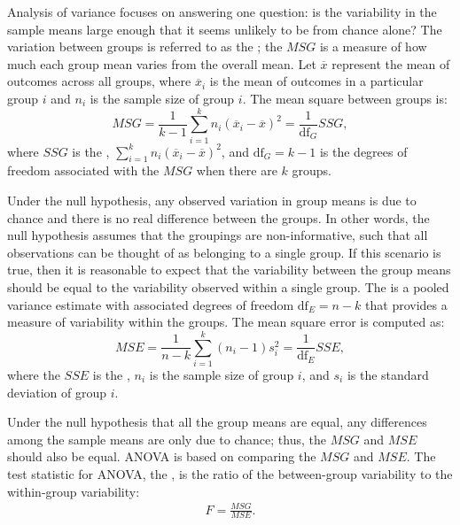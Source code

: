 Analysis of variance focuses on answering one question: is the variability in the sample means large enough that it seems unlikely to be from chance alone? The variation between groups is referred to as the ; the $MSG$ is a measure of how much each group mean varies from the overall mean. Let $\overline{x}$ represent the mean of outcomes across all groups, where $\overline{x}_i$ is the mean of outcomes in a particular group $i$ and $n_i$ is the sample size of group $i$. The mean square between groups is:
\[MSG = \frac{1}{k-1}\sum_{i=1}^{k} n_{i}\left(\overline{x}_{i} - \overline{x}\right)^{2} = \frac{1}{\textrm{df}_{G}}SSG,\] 
where $SSG$ is the , $\sum_{i=1}^{k} n_{i}\left(\overline{x}_{i} - \overline{x}\right)^{2}$, and $\textrm{df}_{G}=k-1$ is the degrees of freedom associated with the $MSG$ when there are $k$ groups.

\textD{\newpage}

Under the null hypothesis, any observed variation in group means is due to chance and there is no real difference between the groups. In other words, the null hypothesis assumes that the groupings are non-informative, such that all observations can be thought of as belonging to a single group. If this scenario is true, then it is reasonable to expect that the variability between the group means should be equal to the variability observed within a single group. The  is a pooled variance estimate with associated degrees of freedom $\textrm{df}_E=n-k$ that provides a measure of variability within the groups. The mean square error is computed as:
\[MSE = \frac{1}{n-k}\sum_{i=1}^{k} (n_i-1)s_i^{2} = \frac{1}{\textrm{df}_{E}}SSE, \]
where the $SSE$ is the , $n_i$ is the sample size of group $i$, and $s_i$ is the standard deviation of group $i$.

Under the null hypothesis that all the group means are equal, any differences among the sample means are only due to chance; thus, the $MSG$ and $MSE$ should also be equal. ANOVA is based on comparing the $MSG$ and $MSE$. The test statistic for ANOVA, the , is the ratio of the between-group variability to the within-group variability:
\begin{align}
\label{formulaForTheFStatistic}%
F = \frac{MSG}{MSE}.
\end{align}


